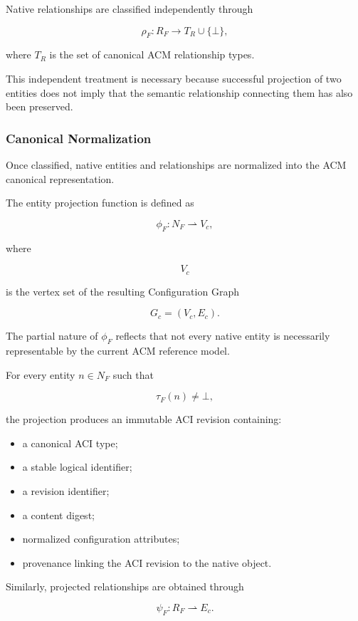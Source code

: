 \documentclass[10pt]{article}
\begin{document}
Native relationships are classified independently through

\[
\rho_F :
R_F
\rightarrow
T_R
\cup
\{\bot\},
\tag{41}
\]

where $T_R$ is the set of canonical ACM relationship types.

This independent treatment is necessary because successful projection of two
entities does not imply that the semantic relationship connecting them has also
been preserved.

\subsubsection{Canonical Normalization}

Once classified, native entities and relationships are normalized into the ACM
canonical representation.

The entity projection function is defined as

\[
\phi_F :
N_F
\rightharpoonup
V_c,
\tag{42}
\]

where

\[
V_c
\]

is the vertex set of the resulting Configuration Graph

\[
G_c=(V_c,E_c).
\]

The partial nature of $\phi_F$ reflects that not every native entity is
necessarily representable by the current ACM reference model.

For every entity $n\in N_F$ such that

\[
\tau_F(n)\neq\bot,
\]

the projection produces an immutable ACI revision containing:

\begin{itemize}
    \item a canonical ACI type;
    \item a stable logical identifier;
    \item a revision identifier;
    \item a content digest;
    \item normalized configuration attributes;
    \item provenance linking the ACI revision to the native object.
\end{itemize}

Similarly, projected relationships are obtained through

\[
\psi_F :
R_F
\rightharpoonup
E_c.
\tag{43}
\]
\end{document}
